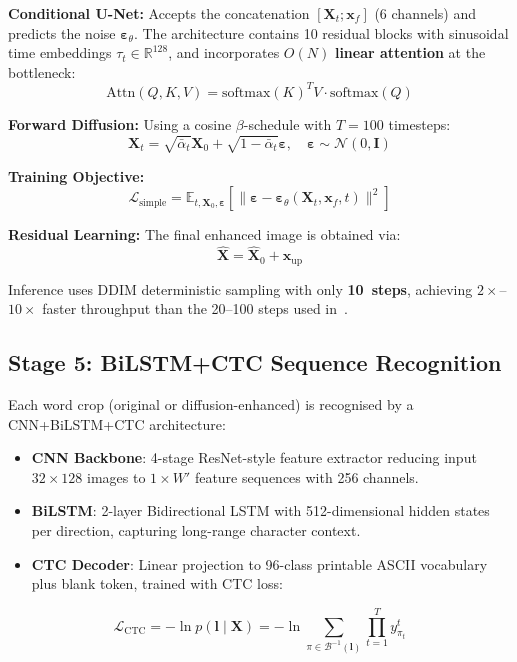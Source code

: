 \documentclass[conference]{IEEEtran}
\begin{document}
\textbf{Conditional U-Net:} Accepts the concatenation $[\mathbf{X}_t; \mathbf{x}_f]$ (6 channels) and predicts the noise $\boldsymbol{\varepsilon}_\theta$. The architecture contains 10 residual blocks with sinusoidal time embeddings $\tau_t \in \mathbb{R}^{128}$, and incorporates $O(N)$ \textbf{linear attention} at the bottleneck:
\begin{equation}
    \text{Attn}(Q, K, V) = \text{softmax}(K)^T V \cdot \text{softmax}(Q)
\end{equation}

\textbf{Forward Diffusion:} Using a cosine $\beta$-schedule with $T = 100$ timesteps:
\begin{equation}
    \mathbf{X}_t = \sqrt{\bar{\alpha}_t} \mathbf{X}_0 + \sqrt{1 - \bar{\alpha}_t} \boldsymbol{\varepsilon}, \quad \boldsymbol{\varepsilon} \sim \mathcal{N}(0, \mathbf{I})
    \label{eq:forward}
\end{equation}

\textbf{Training Objective:}
\begin{equation}
    \mathcal{L}_{\text{simple}} = \mathbb{E}_{t, \mathbf{X}_0, \boldsymbol{\varepsilon}} \left[ \| \boldsymbol{\varepsilon} - \boldsymbol{\varepsilon}_\theta(\mathbf{X}_t, \mathbf{x}_f, t) \|^2 \right]
    \label{eq:diff_loss}
\end{equation}

\textbf{Residual Learning:} The final enhanced image is obtained via:
\begin{equation}
    \hat{\mathbf{X}} = \hat{\mathbf{X}}_0 + \mathbf{x}_{\text{up}}
    \label{eq:residual}
\end{equation}

Inference uses DDIM deterministic sampling with only \textbf{10~steps}, achieving $2\times$--$10\times$ faster throughput than the 20--100 steps used in~\cite{park2024ocrdiff}.

\subsection{Stage 5: BiLSTM+CTC Sequence Recognition}

Each word crop (original or diffusion-enhanced) is recognised by a CNN+BiLSTM+CTC architecture:
\begin{itemize}
    \item \textbf{CNN Backbone}: 4-stage ResNet-style feature extractor reducing input $32 \times 128$ images to $1 \times W'$ feature sequences with 256 channels.
    \item \textbf{BiLSTM}: 2-layer Bidirectional LSTM with 512-dimensional hidden states per direction, capturing long-range character context.
    \item \textbf{CTC Decoder}: Linear projection to 96-class printable ASCII vocabulary plus blank token, trained with CTC loss:
\end{itemize}
\begin{equation}
    \mathcal{L}_{\text{CTC}} = -\ln p(\mathbf{l} \mid \mathbf{X}) = -\ln \sum_{\pi \in \mathcal{B}^{-1}(\mathbf{l})} \prod_{t=1}^{T} y_{\pi_t}^{t}
    \label{eq:ctc}
\end{equation}
\end{document}
